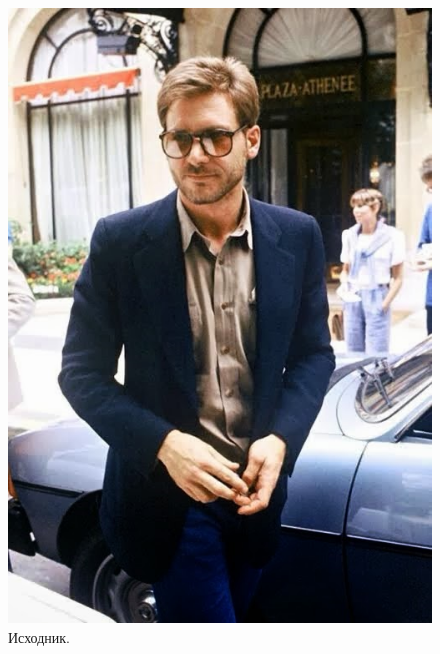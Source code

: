 \documentclass[a4paper,12pt]{article}
\begin{document}
\begin{figure}[h]

\begin{minipage}[h]{0.2\linewidth}
\includegraphics[width=1\linewidth]{Pic}
Исходник. 
\end{minipage}
$\mspace{30mu}$
\begin{minipage}[h]{0.2\linewidth}

\end{minipage}
\end{figure}
\end{document}
